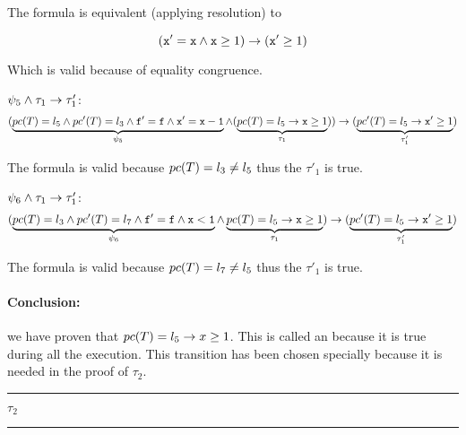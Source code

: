 	The formula is equivalent (applying resolution) to

	\begin{equation*}
		(
			\mathtt{x'=x} \wedge  \mathtt{x}\geq 1
		) 
		\to (\mathtt{x}'\geq 1)
	\end{equation*}


	Which is valid because of equality congruence.

	 $\psi_5 \wedge \tau_1 \to \tau_1'$:
	\begin{equation*}
		(
			\underbrace{pc(T) = l_5 \wedge pc'(T) = l_3 \wedge \mathtt{f'=f} \wedge \mathtt{x'=x-1}}_{\psi_5} \wedge (\underbrace{pc(T) = l_5 \to \mathtt{x}\geq 1}_{\tau_1})
		) 
			\to(\underbrace{pc'(T) = l_5 \to \mathtt{x}' \geq 1}_{\tau_1'})\\\\
	\end{equation*}


	The formula is valid because $pc(T) = l_3 \neq l_5$ thus the $\tau'_1$ is true.

	 $\psi_6 \wedge \tau_1 \to \tau_1'$:
	\begin{equation*}
		(
			\underbrace{pc(T) = l_3 \wedge pc'(T) = l_7 \wedge \mathtt{f'=f} \wedge \mathtt{x<1}}_{\psi_6} \wedge \underbrace{pc(T) = l_5 \to \mathtt{x} \geq 1}_{\tau_1}
		) 
			\to (\underbrace{pc'(T) = l_5 \to \mathtt{x}' \geq 1}_{\tau_1'})\\\\
	\end{equation*}


	The formula is valid because $pc(T) = l_7 \neq l_5$ thus the $\tau'_1$ is true.


\paragraph{Conclusion:} we have proven that $pc(T) = l_5 \to x \geq 1$. 
%
This is called an  because it is true during all the execution. 
%
This transition has been chosen specially because it is needed in the proof of $\tau_2$.

\begin{center}\rule{4cm}{0.4pt}  $\tau_2$  \rule{4cm}{0.4pt}\end{center}


